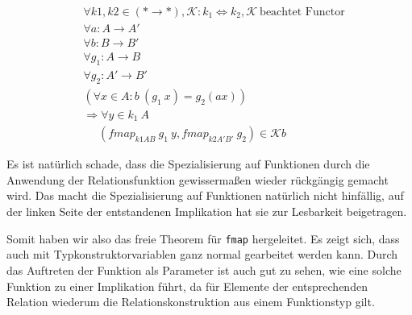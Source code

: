 %
\begin{align*}
&\forall k1, k2 \in (* \rightarrow *), \mathcal{K} : k_1 \Leftrightarrow k_2, \mathcal{K}~\text{beachtet Functor} \\
&\forall a : A \rightarrow A' \\
&\forall b : B \rightarrow B' \\
&\forall g_1 : A \rightarrow B\\
&\forall g_2 : A' \rightarrow B' \\
&(\forall x \in A : b\ (g_1\ x) = g_2 (a x))\\
&\Rightarrow \forall y \in k_1\ A\\
&\ \ \ \ \ \ (fmap_{k1 A B}\ g_1\ y, fmap_{k2 A' B'}\ g_2) \in \mathcal{K} b
\end{align*}

Es ist natürlich schade, dass die Spezialisierung auf Funktionen durch die Anwendung der Relationsfunktion gewissermaßen wieder
rückgängig gemacht wird.
Das macht die Spezialisierung auf Funktionen natürlich nicht hinfällig, auf der linken Seite der entstandenen Implikation hat
sie zur Lesbarkeit beigetragen.

Somit haben wir also das freie Theorem für \texttt{fmap} hergeleitet. Es zeigt sich, dass auch mit Typkonstruktorvariablen ganz normal
gearbeitet werden kann. Durch das Auftreten der Funktion als Parameter ist auch gut zu sehen, wie eine solche Funktion
zu einer Implikation führt, da für Elemente der entsprechenden Relation wiederum die Relationskonstruktion aus einem Funktionstyp
gilt.

